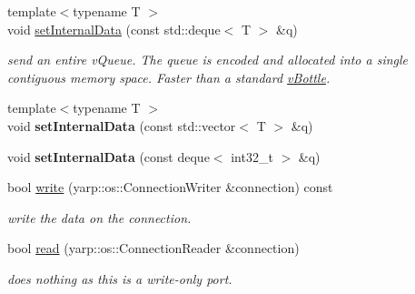 \begin{DoxyCompactItemize}
\mbox{\label{classev_1_1vPortableInterface_aabd7db2eee7f3d39fe6e87023fc39ed2}} 
{\footnotesize template$<$typename T $>$ }\\void \hyperlink{classev_1_1vPortableInterface_aabd7db2eee7f3d39fe6e87023fc39ed2}{set\+Internal\+Data} (const std\+::deque$<$ T $>$ \&q)
\begin{DoxyCompactList}\small\item\em send an entire v\+Queue. The queue is encoded and allocated into a single contiguous memory space. Faster than a standard \hyperlink{classev_1_1vBottle}{v\+Bottle}. \end{DoxyCompactList}\item 
\mbox{\label{classev_1_1vPortableInterface_a86eb64481d56c34f3848d27e5cc654f0}} 
{\footnotesize template$<$typename T $>$ }\\void {\bfseries set\+Internal\+Data} (const std\+::vector$<$ T $>$ \&q)
\item 
\mbox{\label{classev_1_1vPortableInterface_a1483ddacc49ebce50fa482cb87227ce5}} 
void {\bfseries set\+Internal\+Data} (const deque$<$ int32\+\_\+t $>$ \&q)
\item 
\mbox{\label{classev_1_1vPortableInterface_aef6ef668c89f85168f34c7e0c05a6ced}} 
bool \hyperlink{classev_1_1vPortableInterface_aef6ef668c89f85168f34c7e0c05a6ced}{write} (yarp\+::os\+::\+Connection\+Writer \&connection) const
\begin{DoxyCompactList}\small\item\em write the data on the connection. \end{DoxyCompactList}\item 
\mbox{\label{classev_1_1vPortableInterface_ab402795dcf4ab5ca872b5a099197a2e4}} 
bool \hyperlink{classev_1_1vPortableInterface_ab402795dcf4ab5ca872b5a099197a2e4}{read} (yarp\+::os\+::\+Connection\+Reader \&connection)
\begin{DoxyCompactList}\small\item\em does nothing as this is a write-\/only port. \end{DoxyCompactList}\item 
\mbox{\label{classev_1_1vPortableInterface_ac7cd04f6a05e64ec4abe1f9322437315}} 

\end{DoxyCompactItemize}
